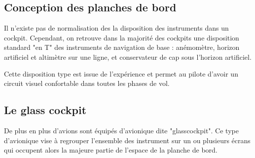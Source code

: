 	\subsection{Conception des planches de bord}
	Il n'existe pas de normalisation des la disposition des instruments dans un cockpit. Cependant, on retrouve dans la majorité des cockpits une disposition standard "en T" des instruments de navigation de base : anémomètre, horizon artificiel et altimètre sur une ligne, et conservateur de cap sous l'horizon artificiel.
	
	\begin{figure}[H]	
	\centering
	\end{figure}
	
	Cette disposition type est issue de l'expérience et permet au pilote d'avoir un circuit visuel confortable dans toutes les phases de vol.
	
	\subsection{Le glass cockpit}
	
	De plus en plus d'avions sont équipés d'avionique dite "\gls{glasscockpit}". Ce type d'avionique vise à regrouper l'ensemble des instrument sur un ou plusieurs écrans qui occupent alors la majeure partie de l'espace de la planche de bord.
	
